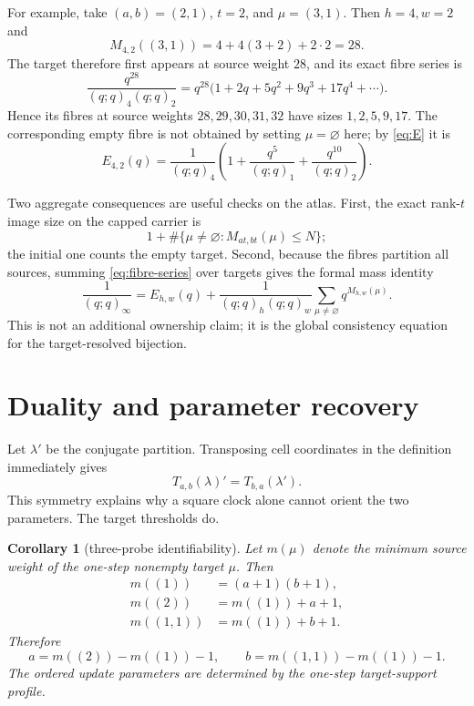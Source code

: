 \documentclass[a4paper,10pt]{amsart}
\newtheorem{corollary}[theorem]{Corollary}
\theoremstyle{remark}
\newcommand{\emptypar}{\varnothing}
\newcommand{\qfac}[1]{(q;q)_{#1}}
\begin{document}
For example, take $(a,b)=(2,1)$, $t=2$, and $\mu=(3,1)$.  Then
$h=4,w=2$ and
\[
 M_{4,2}((3,1))=4+4(3+2)+2\cdot2=28.
\]
The target therefore first appears at source weight $28$, and its exact
fibre series is
\begin{equation}\label{eq:worked-fibre}
 \frac{q^{28}}{\qfac4\qfac2}
  =q^{28}\bigl(1+2q+5q^2+9q^3+17q^4+\cdots\bigr).
\end{equation}
Hence its fibres at source weights $28,29,30,31,32$ have sizes
$1,2,5,9,17$.  The corresponding empty fibre is not obtained by setting
$\mu=\emptypar$ here; by \eqref{eq:E} it is
\[
 E_{4,2}(q)=\frac1{\qfac4}
 \left(1+\frac{q^5}{\qfac1}+\frac{q^{10}}{\qfac2}\right).
\]

Two aggregate consequences are useful checks on the atlas.  First, the exact
rank-$t$ image size on the capped carrier is
\begin{equation}\label{eq:image-size}
 1+\#\{\mu\ne\emptypar:M_{at,bt}(\mu)\leq N\};
\end{equation}
the initial one counts the empty target.  Second, because the fibres partition
all sources, summing \eqref{eq:fibre-series} over targets gives the formal
mass identity
\begin{equation}\label{eq:mass-identity}
 \frac1{(q;q)_\infty}
 =E_{h,w}(q)+\frac1{\qfac h\qfac w}
   \sum_{\mu\ne\emptypar}q^{M_{h,w}(\mu)}.
\end{equation}
This is not an additional ownership claim; it is the global consistency
equation for the target-resolved bijection.

\section{Duality and parameter recovery}\label{sec:recovery}

Let $\lambda'$ be the conjugate partition.  Transposing cell coordinates in
the definition immediately gives
\begin{equation}\label{eq:duality}
 T_{a,b}(\lambda)'=T_{b,a}(\lambda').
\end{equation}
This symmetry explains why a square clock alone cannot orient the two
parameters.  The target thresholds do.

\begin{corollary}[three-probe identifiability]\label{cor:recovery}
Let $m(\mu)$ denote the minimum source weight of the one-step nonempty target
$\mu$.  Then
\begin{align}
 m((1))&=(a+1)(b+1),\label{eq:mcell}\\
 m((2))&=m((1))+a+1,\label{eq:mrow}\\
 m((1,1))&=m((1))+b+1.\label{eq:mcolumn}
\end{align}
Therefore
\begin{equation}\label{eq:recover}
 a=m((2))-m((1))-1,\qquad
 b=m((1,1))-m((1))-1.
\end{equation}
The ordered update parameters are determined by the one-step target-support
profile.
\end{corollary}
\end{document}
